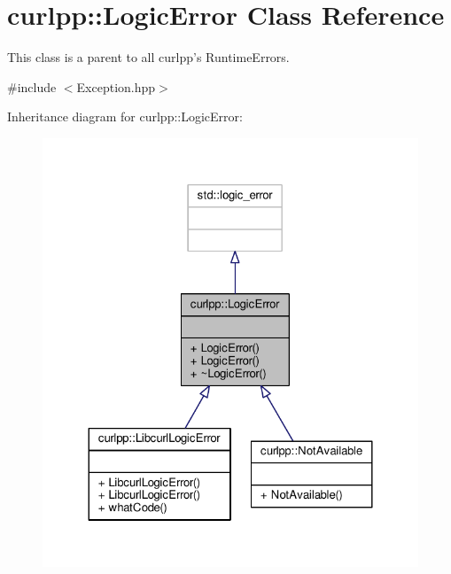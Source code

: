 \hypertarget{classcurlpp_1_1LogicError}{\section{curlpp\-:\-:Logic\-Error Class Reference}
\label{classcurlpp_1_1LogicError}
}


This class is a parent to all curlpp's Runtime\-Errors.  




{\ttfamily \#include $<$Exception.\-hpp$>$}



Inheritance diagram for curlpp\-:\-:Logic\-Error\-:
\nopagebreak
\begin{figure}[H]
\begin{center}
\leavevmode
\includegraphics[width=324pt]{classcurlpp_1_1LogicError__inherit__graph}
\end{center}
\end{figure}


